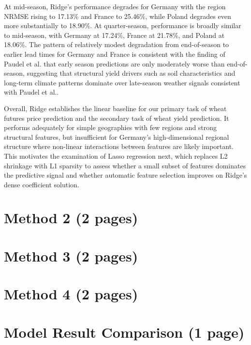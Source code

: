 \documentclass[pdflatex,sn-mathphys-num, oneside]{sn-jnl}%
\theoremstyle{thmstyleone}%
\theoremstyle{thmstyletwo}%
\theoremstyle{thmstylethree}%
\begin{document}
At mid-season, Ridge's performance degrades for Germany with the region NRMSE rising to 17.13\% and France to 25.46\%, while Poland degrades even more substantially to 18.90\%. At quarter-season, performance is broadly similar to mid-season, with Germany at 17.24\%, France at 21.78\%, and Poland at 18.06\%. The pattern of relatively modest degradation from end-of-season to earlier lead times for Germany and France is consistent with the finding of Paudel et al.\cite{bib16} that early season predictions are only moderately worse than end-of-season, suggesting that structural yield drivers such as soil characteristics and long-term climate patterns dominate over late-season weather signals consistent with Paudel et al.\cite{bib16}.

Overall, Ridge establishes the linear baseline for our primary task of wheat futures price prediction and the secondary task of wheat yield prediction. It performs adequately for simple geographies with few regions and strong structural features, but insufficient for Germany's high-dimensional regional structure where non-linear interactions between features are likely important. This motivates the examination of Lasso regression next, which replaces L2 shrinkage with L1 sparsity to assess whether a small subset of features dominates the predictive signal and whether automatic feature selection improves on Ridge's dense coefficient solution.
\clearpage

\section{Method 2 (2 pages)}\label{sec3}

\clearpage

\section{Method 3 (2 pages)}\label{sec3}

\clearpage

\section{Method 4 (2 pages)}\label{sec3}

\clearpage

\section{Model Result Comparison (1 page)}\label{sec3}
\end{document}
